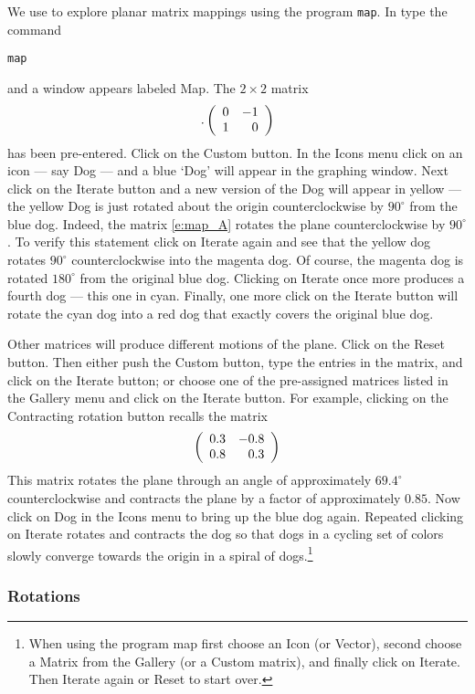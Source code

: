 \documentclass{ximera}
\begin{document}
We use \Matlab to explore planar matrix mappings 
using the program {\tt map}.  In \Matlab type the command
\begin{verbatim}
map
\end{verbatim}
and a window appears labeled {\sf Map}.  The $2\times 2$ matrix
\begin{equation}. \label{e:map_A}
\left(\begin{array}{rr} 0 & -1\\ 1 &0\end{array}\right)
\end{equation}
has been pre-entered.  Click on the {\sf Custom} button. In 
the {\sf Icons} menu click on an icon --- say {\sf Dog} --- and 
a blue `{\sf Dog}' will appear in the graphing window. 
Next click on the {\sf Iterate} button and a new version of the {\sf Dog} will
appear in yellow ---the yellow {\sf Dog} is just rotated about
the origin counterclockwise by $90^\circ$ from the blue dog.
Indeed, the matrix \eqref{e:map_A} rotates the plane counterclockwise
by $90^\circ$.  To verify this statement click on {\sf Iterate}
again and see that the yellow dog rotates $90^\circ$
counterclockwise into the magenta dog.  Of course, the magenta
dog is rotated $180^\circ$ from the original blue dog.
Clicking on {\sf Iterate} once more produces a fourth dog --- this one
in cyan.  Finally, one more click on the {\sf Iterate} button will
rotate the cyan dog into a red dog that exactly covers the
original blue dog.

Other matrices will produce different motions of the plane.  Click 
on the {\sf Reset} button.  Then either push the {\sf Custom} button,  
type the entries in the matrix, and click on the {\sf Iterate} button; 
or choose one of the pre-assigned matrices listed in the {\sf Gallery} menu
and click on the {\sf Iterate} button.  
For example, clicking on the {\sf Contracting rotation} button recalls the matrix
\[
\left(\begin{array}{rr} 0.3 & -0.8\\ 0.8 &0.3\end{array}\right)
\]
This matrix rotates the plane through an angle of approximately
$69.4^\circ$ counterclockwise and contracts the plane by a
factor of approximately $0.85$.  Now click on {\sf Dog} in the
{\sf Icons} menu to bring up the blue dog again.  Repeated
clicking on {\sf Iterate} rotates and contracts the dog so that dogs
in a cycling set of colors slowly converge towards the origin in
a spiral of dogs.\footnote{When using the program {\sf map} first 
choose an Icon (or Vector), second choose a Matrix from the Gallery 
(or a Custom matrix), and finally click on {\sf Iterate}. Then {\sf Iterate} 
again or {\sf Reset} to start over.}

\subsubsection*{Rotations}
\end{document}
